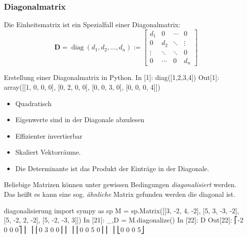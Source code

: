 
\subsubsection{Diagonalmatrix}
Die Einheitsmatrix ist ein Spezialfall einer Diagonalmatrix:
 $$ \mathbf{D}=\operatorname {diag} (d_{1},d_{2},\dotsc ,d_{n}):={\begin{bmatrix}d_{1}&0&\cdots &0\\0&d_{2}&\ddots &\vdots \\\vdots &\ddots &\ddots &0\\0&\cdots &0&d_{n}\end{bmatrix}} $$

\begin{python}{Erstellung einer Diagonalmatrix in Python.}
In [1]: diag([1,2,3,4])
Out[1]:
array([[1, 0, 0, 0],
       [0, 2, 0, 0],
       [0, 0, 3, 0],
       [0, 0, 0, 4]])
\end{python}

\begin{itemize}
   \item Quadratisch
   \item Eigenwerte sind in der Diagonale abzulesen
   \item Effizienter invertierbar
   \item Skaliert Vektorräume.
   \item Die Determinante ist das Produkt der Einträge in der Diagonale.
\end{itemize}




Beliebige Matrizen können unter gewissen Bedingungen \emph{diagonalisiert} werden. Das heißt es kann eine sog. \emph{ähnliche} Matrix gefunden werden die diagonal ist.
\begin{python}{diagonalisierung}
import sympy as sp  
M = sp.Matrix([[3, -2,  4, -2], 
               [5,  3, -3, -2], 
               [5, -2,  2, -2], 
               [5, -2, -3,  3]]) 
In [21]: _,D = M.diagonalize()
In [22]: D
Out[22]:
⎡-2  0  0  0⎤
⎢           ⎥
⎢0   3  0  0⎥
⎢           ⎥
⎢0   0  5  0⎥
⎢           ⎥
⎣0   0  0  5⎦
\end{python}

